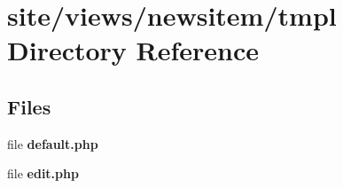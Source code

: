 \section{site/views/newsitem/tmpl Directory Reference}
\label{dir_56dae05e1177674aef229fc31971d5ef}
\subsection*{Files}
\begin{DoxyCompactItemize}
\item 
file \textbf{ default.\+php}
\item 
file \textbf{ edit.\+php}
\end{DoxyCompactItemize}
